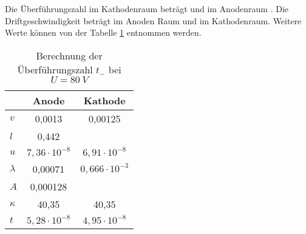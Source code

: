 Die Überführungszahl im Kathodenraum beträgt \UEK und im Anodenraum \UEA .
Die Driftgeschwindigkeit beträgt \DRiftA im Anoden Raum und \DRiftK im Kathodenraum.
Weitere Werte können von der Tabelle \ref{T5} entnommen werden.

\begin{table}
\centering
\begin{tabular}{lcc}
		& Anode			& Kathode\\
\hline
$v$		& 0,0013		& 0,00125\\
$l$		& 0,442 		& \\
$u$ 		& $7,36\cdot 10^{-8}$	& $6,91\cdot 10^{-8}$	\\
$\lambda$ 	& 0,00071 		& $0,666\cdot 10^{-3}$\\
$A$ 		& 0,000128		&	\\
$\kappa$	& 40,35			& 40,35\\
$t$ 		& $5,28\cdot 10^{-8}$	& $4,95\cdot 10^{-8}$\\
\end{tabular}
\caption{Berechnung der Überführungszahl $t_-$ bei $U=80\ V$}
\label{T5}
\end{table}


